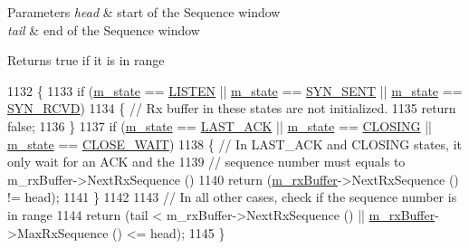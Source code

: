\begin{DoxyParams}{Parameters}
{\em head} & start of the Sequence window \\
\hline
{\em tail} & end of the Sequence window \\
\hline
\end{DoxyParams}
\begin{DoxyReturn}{Returns}
true if it is in range 
\end{DoxyReturn}

\begin{DoxyCode}
1132 \{
1133   \textcolor{keywordflow}{if} (\hyperlink{classns3_1_1TcpSocketBase_a5db6f29272f23546e23320c06a681f3e}{m\_state} == \hyperlink{group__tcp_gga3929cdb47bdf159657fa24054aa5ca03a581d49096b20553996c0ef8aaf2712f8}{LISTEN} || \hyperlink{classns3_1_1TcpSocketBase_a5db6f29272f23546e23320c06a681f3e}{m\_state} == \hyperlink{group__tcp_gga3929cdb47bdf159657fa24054aa5ca03a93f185d16390df3819d44eca0c349cc3}{SYN\_SENT} || 
      \hyperlink{classns3_1_1TcpSocketBase_a5db6f29272f23546e23320c06a681f3e}{m\_state} == \hyperlink{group__tcp_gga3929cdb47bdf159657fa24054aa5ca03abdb50eab9f592a17a412a62deddde11a}{SYN\_RCVD})
1134     \{ \textcolor{comment}{// Rx buffer in these states are not initialized.}
1135       \textcolor{keywordflow}{return} \textcolor{keyword}{false};
1136     \}
1137   \textcolor{keywordflow}{if} (\hyperlink{classns3_1_1TcpSocketBase_a5db6f29272f23546e23320c06a681f3e}{m\_state} == \hyperlink{group__tcp_gga3929cdb47bdf159657fa24054aa5ca03ac7d6d4c1e935aee5aced83a7777cbd6c}{LAST\_ACK} || \hyperlink{classns3_1_1TcpSocketBase_a5db6f29272f23546e23320c06a681f3e}{m\_state} == \hyperlink{group__tcp_gga3929cdb47bdf159657fa24054aa5ca03aed7b7568d5e6519d8ce40712445b533d}{CLOSING} || 
      \hyperlink{classns3_1_1TcpSocketBase_a5db6f29272f23546e23320c06a681f3e}{m\_state} == \hyperlink{group__tcp_gga3929cdb47bdf159657fa24054aa5ca03a812907d056aeb79789f671d657f076a3}{CLOSE\_WAIT})
1138     \{ \textcolor{comment}{// In LAST\_ACK and CLOSING states, it only wait for an ACK and the}
1139       \textcolor{comment}{// sequence number must equals to m\_rxBuffer->NextRxSequence ()}
1140       \textcolor{keywordflow}{return} (\hyperlink{classns3_1_1TcpSocketBase_a0163894148e5a70e6bd89970a1483fae}{m\_rxBuffer}->NextRxSequence () != head);
1141     \}
1142 
1143   \textcolor{comment}{// In all other cases, check if the sequence number is in range}
1144   \textcolor{keywordflow}{return} (tail < m\_rxBuffer->NextRxSequence () || \hyperlink{classns3_1_1TcpSocketBase_a0163894148e5a70e6bd89970a1483fae}{m\_rxBuffer}->MaxRxSequence () <= head);
1145 \}
\end{DoxyCode}


